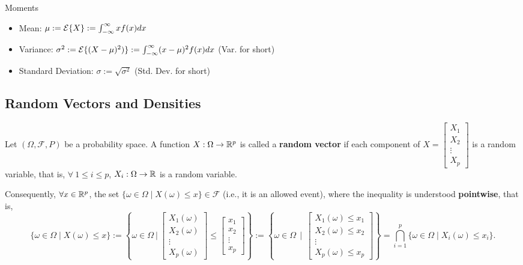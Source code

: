 \begin{definition} Moments
 \begin{itemize}
     \item Mean: $\mu:=\mathcal{E} \{ X\}:= \int_{-\infty}^{\infty} x f(x) dx$

     \item Variance: $\sigma^2:=\mathcal{E} \{ (X-\mu)^2)\}:= \int_{-\infty}^{\infty} (x-\mu)^2f(x) dx$ (Var. for short)

     \item Standard Deviation: $\sigma :=\sqrt{\sigma^2}$ (Std. Dev. for short)
     \end{itemize}

\end{definition}
 

    \subsection{Random Vectors and Densities}
   

\begin{definition}
 Let $(\Omega, \mathscr{F}, P)$ be a probability space. A function $X: \Omega \rightarrow \mathbb R^p$ is called a \textbf{random vector} if each component of $X=\left[ \begin{array}{ccc}
        X_1\\X_2\\\vdots\\X_p\end{array} \right]$ is a random variable, that is, $\forall~ 1 \le i \le p$, $X_i: \Omega \rightarrow \mathbb R$   is a random variable. 
\end{definition} 

Consequently, $\forall x \in \mathbb R^p $, the set $\{\omega \in \Omega \mid X(\omega) \le x\} \in \mathscr{F}$ (i.e., it is an allowed event), where the inequality is understood \textbf{pointwise}, that is,
        $$\{\omega \in \Omega \mid X(\omega) \le x \}:= \left\{\omega \in \Omega ~|~ \begin{bmatrix}X_1(\omega) \\X_2(\omega) \\ \vdots \\ X_p(\omega) \end{bmatrix} \le \begin{bmatrix} x_1 \\x_2 \\ \vdots \\ x_p \end{bmatrix}  \right\} :=\left\{\omega \in \Omega ~~|~~ \begin{bmatrix}X_1(\omega) \le x_1 \\X_2(\omega) \le x_2\\ \vdots \\ X_p(\omega) \le x_p\end{bmatrix} \right\} = \bigcap\limits^p_{i=1} \{\omega \in \Omega \mid X_i(\omega) \le x_i\}.$$

